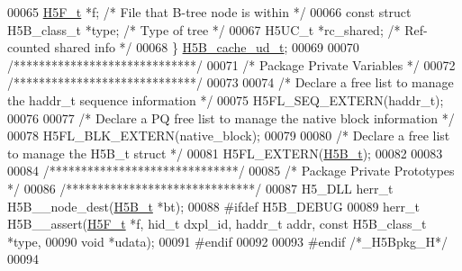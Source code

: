 \begin{DoxyCode}
00065     \hyperlink{struct_h5_f__t}{H5F\_t} *f;                           \textcolor{comment}{/* File that B-tree node is within   */}
00066     \textcolor{keyword}{const} \textcolor{keyword}{struct }H5B\_class\_t *type;     \textcolor{comment}{/* Type of tree              */}
00067     H5UC\_t *rc\_shared;                  \textcolor{comment}{/* Ref-counted shared info       */}
00068 \} \hyperlink{struct_h5_b__cache__ud__t}{H5B\_cache\_ud\_t};
00069 
00070 \textcolor{comment}{/*****************************/}
00071 \textcolor{comment}{/* Package Private Variables */}
00072 \textcolor{comment}{/*****************************/}
00073 
00074 \textcolor{comment}{/* Declare a free list to manage the haddr\_t sequence information */}
00075 H5FL\_SEQ\_EXTERN(haddr\_t);
00076 
00077 \textcolor{comment}{/* Declare a PQ free list to manage the native block information */}
00078 H5FL\_BLK\_EXTERN(native\_block);
00079 
00080 \textcolor{comment}{/* Declare a free list to manage the H5B\_t struct */}
00081 H5FL\_EXTERN(\hyperlink{struct_h5_b__t}{H5B\_t});
00082 
00083 
00084 \textcolor{comment}{/******************************/}
00085 \textcolor{comment}{/* Package Private Prototypes */}
00086 \textcolor{comment}{/******************************/}
00087 H5\_DLL herr\_t H5B\_\_node\_dest(\hyperlink{struct_h5_b__t}{H5B\_t} *bt);
00088 \textcolor{preprocessor}{#ifdef H5B\_DEBUG}
00089 herr\_t H5B\_\_assert(\hyperlink{struct_h5_f__t}{H5F\_t} *f, hid\_t dxpl\_id, haddr\_t addr, \textcolor{keyword}{const} H5B\_class\_t *type,
00090              \textcolor{keywordtype}{void} *udata);
00091 \textcolor{preprocessor}{#endif}
00092 
00093 \textcolor{preprocessor}{#endif }\textcolor{comment}{/*\_H5Bpkg\_H*/}\textcolor{preprocessor}{}
00094 
\end{DoxyCode}
